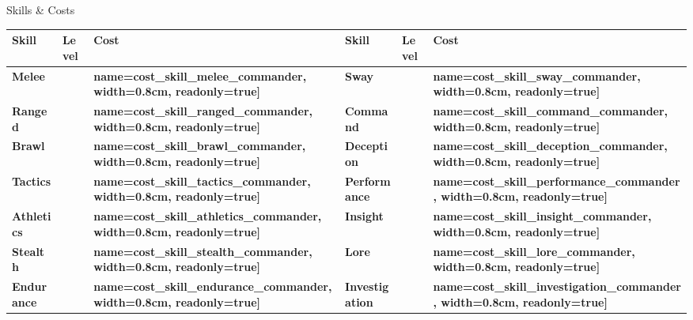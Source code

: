 \documentclass[10pt]{article}
\newcommand{\skilldots}[1]{%
  \TextField[
    name=#1,
    bordercolor={0 0 0},
    backgroundcolor={255 255 255},
    readonly=false,
    width=1.5cm,
    height=0.45cm,
    maxlen=1,
    chars=2,
    align=0,
    default=0
  ]{}%
  \hspace{-0.2em}%
  \raisebox{0.4ex}{%
    \small%
    \textcolor{gray}{%
      \(\bigcirc\)\(\bigcirc\)\(\bigcirc\)\(\bigcirc\)\(\bigcirc\)%
    }%
  }%
}
\newcommand{\tf}[1]{\TextField[#1]{}}
\begin{document}
\begin{Form}
\begin{minipage}[t]{0.48\linewidth}
    \begin{charbox}{Skills \& Costs}
        \begin{tabular}{>{\bfseries}p{2.5cm} >{\bfseries}p{1.5cm} >{\bfseries}p{1.5cm} >{\bfseries}p{2.5cm} >{\bfseries}p{1.5cm} >{\bfseries}p{1.5cm}}
            \toprule
            \textbf{Skill} & \textbf{Level} & \textbf{Cost} & \textbf{Skill} & \textbf{Level} & \textbf{Cost} \\
            \midrule
            Melee & \skilldots{skill_melee_commander} & \tf[name=cost_skill_melee_commander, width=0.8cm, readonly=true]{} & 
            Sway & \skilldots{skill_sway_commander} & \tf[name=cost_skill_sway_commander, width=0.8cm, readonly=true]{} \\
            Ranged & \skilldots{skill_ranged_commander} & \tf[name=cost_skill_ranged_commander, width=0.8cm, readonly=true]{} & 
            Command & \skilldots{skill_command_commander} & \tf[name=cost_skill_command_commander, width=0.8cm, readonly=true]{} \\
            Brawl & \skilldots{skill_brawl_commander} & \tf[name=cost_skill_brawl_commander, width=0.8cm, readonly=true]{} & 
            Deception & \skilldots{skill_deception_commander} & \tf[name=cost_skill_deception_commander, width=0.8cm, readonly=true]{} \\
            Tactics & \skilldots{skill_tactics_commander} & \tf[name=cost_skill_tactics_commander, width=0.8cm, readonly=true]{} & 
            Performance & \skilldots{skill_performance_commander} & \tf[name=cost_skill_performance_commander, width=0.8cm, readonly=true]{} \\
            Athletics & \skilldots{skill_athletics_commander} & \tf[name=cost_skill_athletics_commander, width=0.8cm, readonly=true]{} & 
            Insight & \skilldots{skill_insight_commander} & \tf[name=cost_skill_insight_commander, width=0.8cm, readonly=true]{} \\
            Stealth & \skilldots{skill_stealth_commander} & \tf[name=cost_skill_stealth_commander, width=0.8cm, readonly=true]{} & 
            Lore & \skilldots{skill_lore_commander} & \tf[name=cost_skill_lore_commander, width=0.8cm, readonly=true]{} \\
            Endurance & \skilldots{skill_endurance_commander} & \tf[name=cost_skill_endurance_commander, width=0.8cm, readonly=true]{} & 
            Investigation & \skilldots{skill_investigation_commander} & \tf[name=cost_skill_investigation_commander, width=0.8cm, readonly=true]{} \\

\end{tabular}
\end{charbox}
\end{minipage}
\end{Form}
\end{document}
